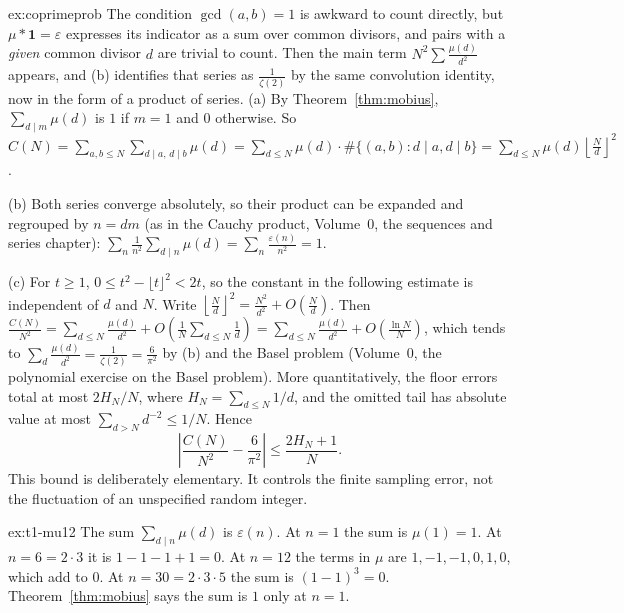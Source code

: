 \begin{solution}{ex:coprimeprob}
\idea The condition $\gcd(a,b)=1$ is awkward to count directly, but $\mu*\mathbf 1=\varepsilon$ expresses its indicator as a sum over common divisors, and pairs with a \emph{given} common divisor $d$ are trivial to count. Then the main term $N^2\sum\frac{\mu(d)}{d^2}$ appears, and (b) identifies that series as $\frac1{\zeta(2)}$ by the same convolution identity, now in the form of a product of series.
\writeup (a) By Theorem~\ref{thm:mobius}, $\sum_{d\mid m}\mu(d)$ is $1$ if $m=1$ and $0$ otherwise. So
$C(N)=\sum_{a,b\le N}\sum_{d\mid a,\,d\mid b}\mu(d)=\sum_{d\le N}\mu(d)\cdot\#\{(a,b):d\mid a,d\mid b\}=\sum_{d\le N}\mu(d)\left\lfloor\frac Nd\right\rfloor^2$.

(b) Both series converge absolutely, so their product can be expanded and regrouped by $n=dm$ (as in the Cauchy product, Volume~0, the sequences and series chapter): $\sum_n\frac1{n^2}\sum_{d\mid n}\mu(d)=\sum_n\frac{\varepsilon(n)}{n^2}=1$.

(c) For $t\ge1$, $0\le t^2-\lfloor t\rfloor^2<2t$, so the
constant in the following estimate is independent of $d$ and $N$.
Write $\left\lfloor\frac Nd\right\rfloor^2=\frac{N^2}{d^2}+O\left(\frac Nd\right)$. Then
$\frac{C(N)}{N^2}=\sum_{d\le N}\frac{\mu(d)}{d^2}+O\left(\frac1N\sum_{d\le N}\frac1d\right)=\sum_{d\le N}\frac{\mu(d)}{d^2}+O\left(\frac{\ln N}N\right)$,
which tends to $\sum_d\frac{\mu(d)}{d^2}=\frac1{\zeta(2)}=\frac6{\pi^2}$ by (b) and the Basel problem (Volume~0, the polynomial exercise on the Basel problem).
More quantitatively, the floor errors total at most $2H_N/N$, where
$H_N=\sum_{d\le N}1/d$, and the omitted tail has absolute value at most
$\sum_{d>N}d^{-2}\le1/N$. Hence
\[
\left|\frac{C(N)}{N^2}-\frac6{\pi^2}\right|
\le\frac{2H_N+1}{N}.
\]
This bound is deliberately elementary. It controls the finite sampling error,
not the fluctuation of an unspecified random integer.

\end{solution}

\begin{solution}{ex:t1-mu12}
\idea The sum $\sum_{d\mid n}\mu(d)$ is $\varepsilon(n)$.
\writeup At $n=1$ the sum is $\mu(1)=1$. At $n=6=2\cdot 3$ it is $1-1-1+1=0$. At $n=12$ the terms in $\mu$ are $1,-1,-1,0,1,0$, which add to $0$. At $n=30=2\cdot 3\cdot 5$ the sum is $(1-1)^3=0$. Theorem~\ref{thm:mobius} says the sum is $1$ only at $n=1$.
\end{solution}

